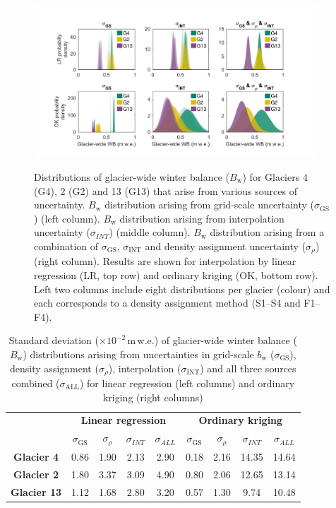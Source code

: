 \documentclass[review,oneside, letterpaper]{igs}
\begin{document}
\begin{figure}
	\centering
	\includegraphics[width =0.95\textwidth]{WSMBDist.pdf}\\
	\caption{Distributions of glacier-wide winter balance ($B_\mathrm{w}$) for Glaciers 4 (G4), 2 (G2) and 13 (G13) that arise from various sources of uncertainty. $B_\mathrm{w}$ distribution arising from grid-scale uncertainty ($\sigma_{\mathrm{GS}}$) (left column). $B_\mathrm{w}$ distribution arising from interpolation uncertainty ($\sigma_{INT}$) (middle column). $B_\mathrm{w}$ distribution arising from a combination of $\sigma_{\mathrm{GS}}$, $\sigma_{\mathrm{INT}}$ and density assignment uncertainty ($\sigma_{\rho}$) (right column). Results are shown for interpolation by linear regression (LR, top row) and ordinary kriging (OK, bottom row). Left two columns include eight distributions per glacier (colour) and each corresponds to a density assignment method (S1--S4 and F1--F4).}
	\label{fig:WSMBDist_LR}
\end{figure}

\begin{table}[]
\centering
\caption{Standard deviation ($\times10^{-2}$\,m\,w.e.) of glacier-wide winter balance ($B_\mathrm{w}$) distributions arising from uncertainties in grid-scale $b_\mathrm{w}$ ($\sigma_{\mathrm{GS}}$), density assignment ($\sigma_{\rho}$), interpolation ($\sigma_{\mathrm{INT}}$) and all three sources combined ($\sigma_{\mathrm{ALL}}$) for linear regression (left columns) and ordinary kriging (right columns)}
\label{tab:WSMBdistribution_sigma}
\begin{tabular}{c|cccc|cccc}
 & \multicolumn{4}{c|}{\textbf{Linear regression}} & \multicolumn{4}{c}{\textbf{Ordinary kriging}} \\
\textbf{} & $\sigma_{\mathrm{GS}}$ & $\sigma_{\rho}$ & $\sigma_{INT}$ & $\sigma_{ALL}$ & $\sigma_{\mathrm{GS}}$ & $\sigma_{\rho}$ & $\sigma_{INT}$ & $\sigma_{ALL}$ \\ \hline
\textbf{Glacier 4} & 0.86 & 1.90 & 2.13 & 2.90 & 0.18 & 2.16 & 14.35 & 14.64 \\
\textbf{Glacier 2} & 1.80 & 3.37 & 3.09 & 4.90 & 0.80 & 2.06 & 12.65 & 13.14 \\
\textbf{Glacier 13} & 1.12 & 1.68 & 2.80 & 3.20 & 0.57 & 1.30 & 9.74 & 10.48
\end{tabular}
\end{table}
\end{document}
